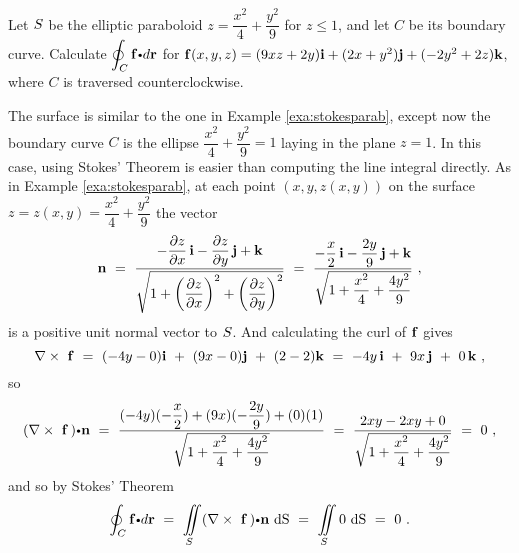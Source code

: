 

\begin{exa}
 Let $S$ be the elliptic paraboloid $z=\dfrac{x^2}{4}+\dfrac{y^2}{9}$ for $z \le 1$, and let $C$ be its boundary
 curve.
 Calculate $\olineintvec{C}{f}{r}$ for $\mathbf{ f}(x,y,z)=(9xz+2y)\mathbf{ i}+(2x+y^2 )\mathbf{ j}+(-2y^2 +2z)\mathbf{ k}$,
 where $C$ is traversed counterclockwise.\vspace{1mm}
\end{exa}
\begin{solu}
 The surface is similar to the one in Example \ref{exa:stokesparab}, except now the
 boundary curve $C$ is the ellipse $\dfrac{x^2}{4}+\dfrac{y^2}{9}=1$ laying in the plane $z=1$. In this case, using
 Stokes' Theorem is easier than computing the line integral directly. As in Example \ref{exa:stokesparab}, at each
 point $(x,y,z(x,y))$ on the surface $z=z(x,y)=\dfrac{x^2}{4}+\dfrac{y^2}{9}$ the vector
 \begin{displaymath}
  \mathbf{ n} ~=~
   \dfrac{-\dfrac{\partial z}{\partial x}\,\mathbf{ i} - \dfrac{\partial z}{\partial y}\,\mathbf{ j} +
   \mathbf{ k}}{\sqrt{1 + \left( \dfrac{\partial z}{\partial x} \right)^2 +
   \left( \dfrac{\partial z}{\partial y} \right)^2}} ~=~
   \dfrac{-\dfrac{x}{2}\,\mathbf{ i} - \dfrac{2y}{9}\,\mathbf{ j} + \mathbf{ k}}{\sqrt{1 +\dfrac{x^2}{4}+
    \dfrac{4y^2}{9}}} ~,
 \end{displaymath}
 is a positive unit normal vector to $S$. And calculating the curl of $\mathbf{ f}$ gives
 \begin{displaymath}
  \nabla \times~\mathbf{ f} ~=~ (-4y-0)\mathbf{ i} ~+~ (9x-0)\mathbf{ j} ~+~ (2-2)\mathbf{ k} ~=~ -4y\,\mathbf{ i} ~+~ 9x\,\mathbf{ j} ~+~
   0\,\mathbf{ k}~,
 \end{displaymath}
 so
 \begin{displaymath}
  \Dotprod{(\curlb~{\vector{f}}\,)}{\vector{n}} ~=~ \dfrac{(-4y)(-\dfrac{x}{2})+(9x)(-\dfrac{2y}{9})+
   (0)(1)}{\sqrt{1 +\dfrac{x^2}{4}+\dfrac{4y^2}{9}}} ~=~ \dfrac{2xy-2xy+0}{\sqrt{1 +\dfrac{x^2}{4}+\dfrac{4y^2}{9}}} ~=~ 0~,
 \end{displaymath}
 and so by Stokes' Theorem
 \begin{displaymath}
  \olineintvec{C}{f}{r} ~=~ \diint\limits_{\superficie} \Dotprod{(\curlb~{\vector{f}}\,)}{\vector{n}}\, \d \S ~=~
   \diint\limits_{\superficie} 0\, \d \S ~=~ 0 ~.
 \end{displaymath}
\end{solu}




